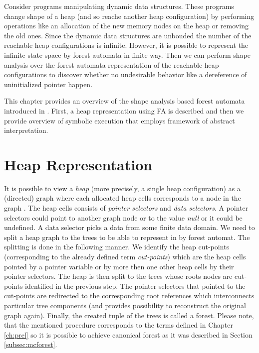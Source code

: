 Consider programs manipulating dynamic data structures.
These programs change shape of a heap (and so reache another heap configuration)
by performing operations like an allocation of the new memory nodes on the heap
or removing the old ones.
Since the dynamic data structures are unbouded the number of
the reachable heap configurations is infinite.
However, it is possible to represent the infinite state space by forest automata in finite way.
Then we can perform shape analysis over the forest automata representation of the reachable
heap configurations to discover whether no undesirable behavior like a dereference of uninitialized
pointer happen.

This chapter provides an overview of the shape analysis based forest automata introduced in \cite{forester12}.
First, a heap representation using FA is described and then
we provide overview of symbolic execution that employs framework of abstract interpretation.

\section{Heap Representation}
\label{sec:hd}

It is possible to view a \emph{heap} (more precisely, a single heap configuration)
as a (directed) graph where each allocated heap cells corresponds to a node in the graph \cite{forester13}.
The heap cells consists of \emph{pointer selectors} and \emph{data selectors}.
A pointer selectors could point to another graph node or to the value \emph{null} or it could be undefined.
A data selector picks a data from some finite data domain.
We need to split a heap graph to the trees to be able to represent in by forest automat.
The splitting is done in the following manner.
We identify the heap cut-points (corresponding to the already defined term \emph{cut-points})
which are the heap cells pointed by a pointer variable or by more then one other heap cells by their pointer selectors.
The heap is then split to the trees whose roots nodes are cut-points identified in the previous step.
The pointer selectors that pointed to the cut-points are redirected to the corresponding root references which interconnects
particular tree components (and provides possibility to reconstruct the original graph again).
Finally, the created tuple of the trees is called a forest.
Please note, that the mentioned procedure corresponds to the terms defined in Chapter \ref{ch:prel}
so it is possible to achieve canonical forest as it was described in Section \ref{subsec:mcforest}.

